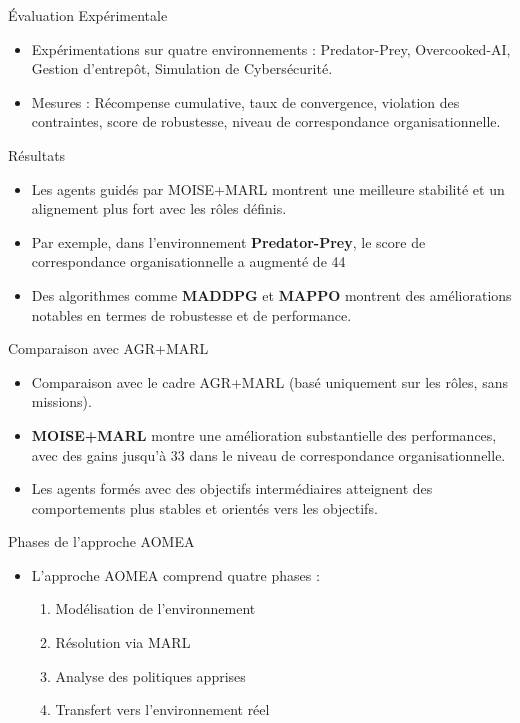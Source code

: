 \documentclass{beamer}
\begin{document}
\begin{frame}{Évaluation Expérimentale}
    \begin{itemize}
        \item Expérimentations sur quatre environnements : Predator-Prey, Overcooked-AI, Gestion d'entrepôt, Simulation de Cybersécurité.
        \item Mesures : Récompense cumulative, taux de convergence, violation des contraintes, score de robustesse, niveau de correspondance organisationnelle.
    \end{itemize}
\end{frame}

\begin{frame}{Résultats}
    \begin{itemize}
        \item Les agents guidés par MOISE+MARL montrent une meilleure stabilité et un alignement plus fort avec les rôles définis.
        \item Par exemple, dans l'environnement \textbf{Predator-Prey}, le score de correspondance organisationnelle a augmenté de 44%
        \item Des algorithmes comme \textbf{MADDPG} et \textbf{MAPPO} montrent des améliorations notables en termes de robustesse et de performance.
    \end{itemize}
\end{frame}

\begin{frame}{Comparaison avec AGR+MARL}
    \begin{itemize}
        \item Comparaison avec le cadre AGR+MARL (basé uniquement sur les rôles, sans missions).
        \item \textbf{MOISE+MARL} montre une amélioration substantielle des performances, avec des gains jusqu'à 33 dans le niveau de correspondance organisationnelle.
        \item Les agents formés avec des objectifs intermédiaires atteignent des comportements plus stables et orientés vers les objectifs.
    \end{itemize}
\end{frame}

\begin{frame}{Phases de l'approche AOMEA}
    \begin{itemize}
        \item L'approche AOMEA comprend quatre phases :
        \begin{enumerate}
            \item Modélisation de l'environnement
            \item Résolution via MARL
            \item Analyse des politiques apprises
            \item Transfert vers l'environnement réel
        \end{enumerate}
    \end{itemize}
\end{frame}
\end{document}
